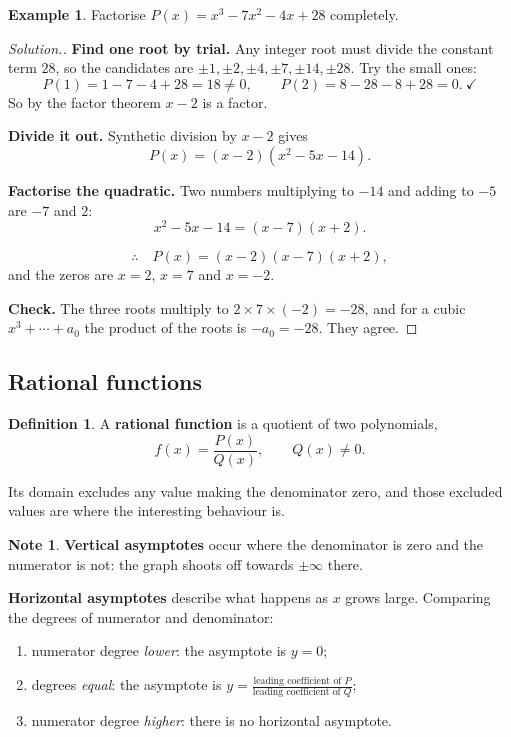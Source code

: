 \documentclass[11pt,a4paper]{article}
\theoremstyle{definition}
\newtheorem{definition}[thm]{Definition}
\newtheorem{example}[thm]{Example}
\newtheorem{note}[thm]{Note}
\newenvironment{solution}
  {\renewcommand{\qedsymbol}{}\begin{proof}[\textit{Solution}.]}
  {\end{proof}}
\let\amscheckmark\checkmark
\renewcommand{\checkmark}{\ensuremath{\amscheckmark}}
\begin{document}
\begin{example}
Factorise $P(x)=x^3-7x^2-4x+28$ completely.
\end{example}

\begin{solution}
\textbf{Find one root by trial.} Any integer root must divide the constant term $28$,
so the candidates are $\pm 1,\pm 2,\pm 4,\pm 7,\pm 14,\pm 28$. Try the small ones:
$$P(1)=1-7-4+28=18\neq 0,\qquad P(2)=8-28-8+28=0.\ \checkmark$$
So by the factor theorem $x-2$ is a factor.

\textbf{Divide it out.} Synthetic division by $x-2$ gives
$$P(x)=(x-2)\left(x^2-5x-14\right).$$

\textbf{Factorise the quadratic.} Two numbers multiplying to $-14$ and adding to $-5$
are $-7$ and $2$:
$$x^2-5x-14=(x-7)(x+2).$$

$$\therefore\quad P(x)=(x-2)(x-7)(x+2),$$
and the zeros are $x=2$, $x=7$ and $x=-2$.

\textbf{Check.} The three roots multiply to $2\times 7\times(-2)=-28$, and for a cubic
$x^3+\cdots+a_0$ the product of the roots is $-a_0=-28$. They agree.
\end{solution}

\subsection{Rational functions}

\begin{definition}
A \textbf{rational function} is a quotient of two polynomials,
$$f(x)=\frac{P(x)}{Q(x)},\qquad Q(x)\neq 0.$$
\end{definition}

Its domain excludes any value making the denominator zero, and those excluded values
are where the interesting behaviour is.

\begin{note}
\textbf{Vertical asymptotes} occur where the denominator is zero and the numerator is
not: the graph shoots off towards $\pm\infty$ there.

\textbf{Horizontal asymptotes} describe what happens as $x$ grows large. Comparing the
degrees of numerator and denominator:
\begin{enumerate}
\item[(i).] numerator degree \emph{lower}: the asymptote is $y=0$;
\item[(ii).] degrees \emph{equal}: the asymptote is $y=\frac{\text{leading
coefficient of }P}{\text{leading coefficient of }Q}$;
\item[(iii).] numerator degree \emph{higher}: there is no horizontal asymptote.
\end{enumerate}
\end{note}
\end{document}
